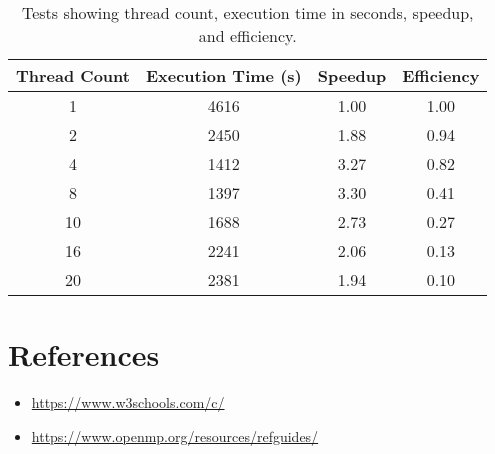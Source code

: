 \documentclass{article}
\begin{document}
	\begin{table}[t]
		\centering
		\begin{tabular}{|c|c|c|c|}
			\hline
			\textbf{Thread Count} & \textbf{Execution Time (s)} & \textbf{Speedup} & \textbf{Efficiency} \\
			\hline
			1  & 4616 & 1.00 & 1.00 \\
			2  & 2450 & 1.88 & 0.94 \\
			4  & 1412 & 3.27 & 0.82 \\
			8  & 1397 & 3.30 & 0.41 \\
			10 & 1688 & 2.73 & 0.27 \\
			16 & 2241 & 2.06 & 0.13 \\
			20 & 2381 & 1.94 & 0.10 \\
			\hline
		\end{tabular}
		\caption{Tests showing thread count, execution time in seconds, speedup, and efficiency.}
		\label{table1}
	\end{table}
	
	\section{References}
	\begin{itemize}
		\item \href{https://www.w3schools.com/c/}{https://www.w3schools.com/c/}
		\item \href{https://www.openmp.org/resources/refguides/}{https://www.openmp.org/resources/refguides/}
	\end{itemize}
	
\end{document}
